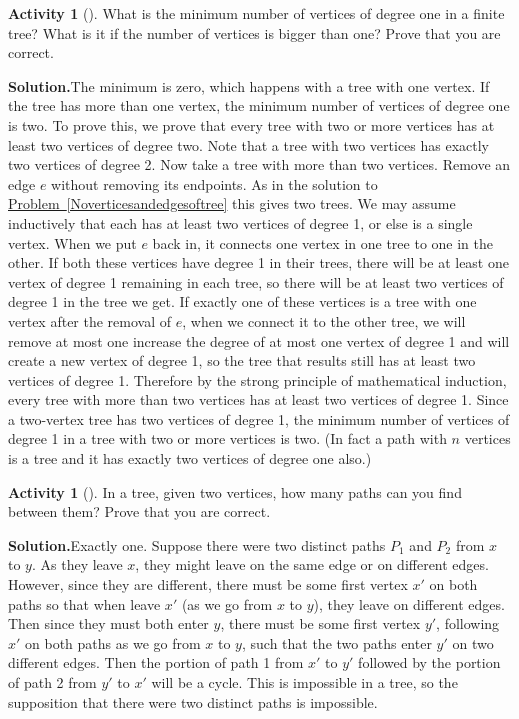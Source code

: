 \documentclass[10pt,]{book}
\theoremstyle{plain}
\theoremstyle{definition}
\newtheorem{activity}[project]{Activity}
\numberwithin{equation}{chapter}
\begin{document}
\begin{activity}[]\label{activity-101}
What is the minimum number of vertices of degree one in a finite tree? What is it if the number of vertices is bigger than one? Prove that you are correct.%
\par\medskip\noindent%
\textbf{Solution.}\quad The minimum is zero, which happens with a tree with one vertex. If the tree has more than one vertex, the minimum number of vertices of degree one is two. To prove this, we prove that every tree with two or more vertices has at least two vertices of degree two. Note that a tree with two vertices has exactly two vertices of degree 2. Now take a tree with more than two vertices. Remove an edge \(e\) without removing its endpoints. As in the solution to \hyperref[Noverticesandedgesoftree]{Problem~\ref{Noverticesandedgesoftree}} this gives two trees. We may assume inductively that each has at least two vertices of degree 1, or else is a single vertex. When we put \(e\) back in, it connects one vertex in one tree to one in the other. If both these vertices have degree 1 in their trees, there will be at least one vertex of degree 1 remaining in each tree, so there will be at least two vertices of degree 1 in the tree we get. If exactly one of these vertices is a tree with one vertex after the removal of \(e\), when we connect it to the other tree, we will remove at most one increase the degree of at most one vertex of degree 1 and will create a new vertex of degree 1, so the tree that results still has at least two vertices of degree 1. Therefore by the strong principle of mathematical induction, every tree with more than two vertices has at least two vertices of degree 1. Since a two-vertex tree has two vertices of degree 1, the minimum number of vertices of degree 1 in a tree with two or more vertices is two. (In fact a path with \(n\) vertices is a tree and it has exactly two vertices of degree one also.)%
\end{activity}
\begin{activity}[]\label{activity-102}
In a tree, given two vertices, how many paths can you find between them? Prove that you are correct.%
\par\medskip\noindent%
\textbf{Solution.}\quad Exactly one. Suppose there were two distinct paths \(P_1\) and \(P_2\) from \(x\) to \(y\). As they leave \(x\), they might leave on the same edge or on different edges. However, since they are different, there must be some first vertex \(x'\) on both paths so that when leave \(x'\) (as we go from \(x\) to \(y\)), they leave on different edges. Then since they must both enter \(y\), there must be some first vertex \(y'\), following \(x'\) on both paths as we go from \(x\) to \(y\), such that the two paths enter \(y'\) on two different edges. Then the portion of path 1 from \(x'\) to \(y'\) followed by the portion of path 2 from \(y'\) to \(x'\) will be a cycle. This is impossible in a tree, so the supposition that there were two distinct paths is impossible.%
\end{activity}
\end{document}
